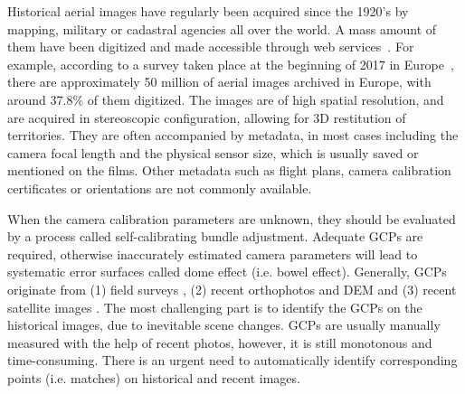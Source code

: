 \par
Historical aerial images have regularly been acquired since the 1920’s by mapping, military or cadastral agencies all over the world. A mass amount of them have been digitized and made accessible through web services~\cite{sebastien2019archiving,earthexplorer,remonterletemps}. 
For example, according to a survey taken place at the beginning of 2017 in Europe~\cite{sebastien2019archiving}, there are approximately 50 million of aerial images archived in Europe, with around 37.8\% of them digitized.
The images are of high spatial resolution, and are acquired in stereoscopic configuration, allowing for 3D restitution of territories. 
They are often accompanied by metadata, in most cases including the camera focal length and the physical sensor size, which is usually saved or mentioned on the films. Other metadata such as flight plans, camera calibration certificates or orientations are not commonly available. 
\par
When the camera calibration parameters are unknown, they should be evaluated by a process called self-calibrating bundle adjustment. Adequate \ac{GCP}s are required, otherwise inaccurately estimated camera parameters will lead to systematic error surfaces called dome effect (i.e. bowel effect).
Generally, \ac{GCP}s originate from (1) field surveys \cite{micheletti2015application,walstra2004time,cardenal2006use}, (2) recent orthophotos and DEM \cite{nurminen2015automation,ellis2006measuring,fox2008unlocking} and (3) recent satellite images \cite{ellis2006measuring,ford2013shoreline}. The most challenging part is to identify the \ac{GCP}s on the historical images, due to inevitable scene changes. \ac{GCP}s are usually manually measured with the help of recent photos, however, it is still monotonous and time-consuming. 
There is an urgent need to automatically identify corresponding points (i.e. matches) on historical and recent images.\\
